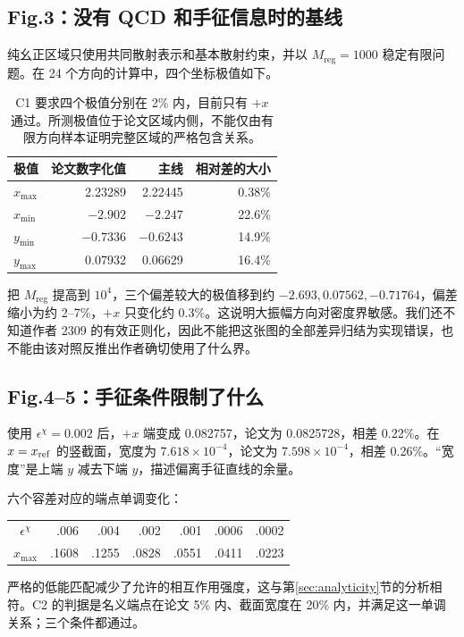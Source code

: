 \documentclass[UTF8,a4paper,11pt,fontset=fandol]{ctexart}
\numberwithin{equation}{section}
\newcommand{\eChi}{\epsilon^{\chi}}
\newcommand{\Mreg}{M_{\mathrm{reg}}}
\begin{document}
\subsection{Fig.3：没有 QCD 和手征信息时的基线}
纯幺正区域只使用共同散射表示和基本散射约束，并以 \(\Mreg=1000\) 稳定有限问题。在 24 个方向的计算中，四个坐标极值如下。
\begin{table}[H]\centering\small
\begin{tabular}{lrrr}
\toprule
极值 & 论文数字化值 & 主线 & 相对差的大小\\
\midrule
\(x_{\max}\) & 2.23289 & 2.22445 & 0.38\%\\
\(x_{\min}\) & \(-2.902\) & \(-2.247\) & 22.6\%\\
\(y_{\min}\) & \(-0.7336\) & \(-0.6243\) & 14.9\%\\
\(y_{\max}\) & 0.07932 & 0.06629 & 16.4\%\\
\bottomrule
\end{tabular}
\caption{C1 要求四个极值分别在 2\% 内，目前只有 \(+x\) 通过。所测极值位于论文区域内侧，不能仅由有限方向样本证明完整区域的严格包含关系。}
\end{table}

把 \(\Mreg\) 提高到 \(10^4\)，三个偏差较大的极值移到约 \(-2.693,0.07562,-0.71764\)，偏差缩小为约 2--7\%，\(+x\) 只变化约 0.3\%。这说明大振幅方向对密度界敏感。我们还不知道作者 2309 的有效正则化，因此不能把这张图的全部差异归结为实现错误，也不能由该对照反推出作者确切使用了什么界。

\subsection{Fig.4--5：手征条件限制了什么}
使用 \(\eChi=0.002\) 后，\(+x\) 端变成 0.082757，论文为 0.0825728，相差 0.22\%。在 \(x=x_{\rm ref}\) 的竖截面，宽度为 \(7.618\times10^{-4}\)，论文为 \(7.598\times10^{-4}\)，相差 0.26\%。“宽度”是上端 \(y\) 减去下端 \(y\)，描述偏离手征直线的余量。

六个容差对应的端点单调变化：
\begin{center}\small
\begin{tabular}{crrrrrr}
\toprule
\(\eChi\) & .006 & .004 & .002 & .001 & .0006 & .0002\\
\(x_{\max}\) & .1608 & .1255 & .0828 & .0551 & .0411 & .0223\\
\bottomrule
\end{tabular}
\end{center}
严格的低能匹配减少了允许的相互作用强度，这与第\ref{sec:analyticity}节的分析相符。C2 的判据是名义端点在论文 5\% 内、截面宽度在 20\% 内，并满足这一单调关系；三个条件都通过。
\end{document}
